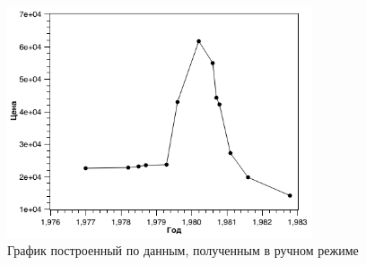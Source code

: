 \documentclass[a4paper,14pt,russian]{report}
\begin{document}
\begin{figure}[!htb]
  \centerline{\includegraphics[width=0.8\textwidth]{graph-custom-manual}}
  \caption{График построенный по данным, полученным в ручном режиме}
  \label{graph:custom-manual}
\end{figure}
\end{document}
